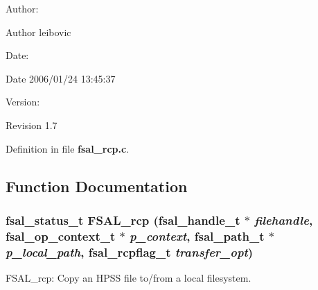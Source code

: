 \begin{Desc}
\item[Author:]\end{Desc}
\begin{Desc}
\item[Author]leibovic \end{Desc}
\begin{Desc}
\item[Date:]\end{Desc}
\begin{Desc}
\item[Date]2006/01/24 13:45:37 \end{Desc}
\begin{Desc}
\item[Version:]\end{Desc}
\begin{Desc}
\item[Revision]1.7 \end{Desc}


Definition in file {\bf fsal\_\-rcp.c}.

\subsection{Function Documentation}
\subsubsection[{FSAL\_\-rcp}]{\setlength{\rightskip}{0pt plus 5cm}fsal\_\-status\_\-t FSAL\_\-rcp (fsal\_\-handle\_\-t $\ast$ {\em filehandle}, \/  fsal\_\-op\_\-context\_\-t $\ast$ {\em p\_\-context}, \/  fsal\_\-path\_\-t $\ast$ {\em p\_\-local\_\-path}, \/  fsal\_\-rcpflag\_\-t {\em transfer\_\-opt})}\label{fsal__rcp_8c_e5f4157c669528dfde3ab5b83bc20fdf}


FSAL\_\-rcp: Copy an HPSS file to/from a local filesystem.

